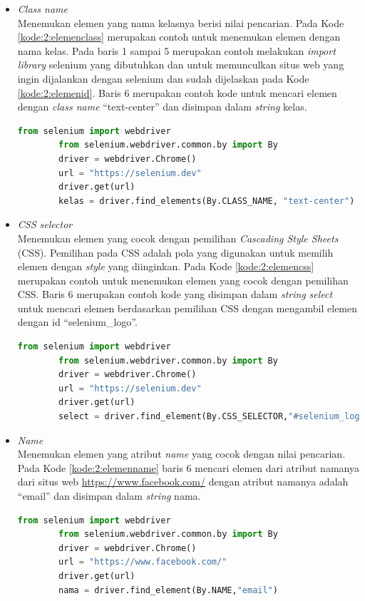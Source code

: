 \begin{itemize}
	\item \textit{Class name}\\
	Menemukan elemen yang nama kelasnya berisi nilai pencarian. Pada Kode \ref{kode:2:elemenclass} merupakan contoh untuk menemukan elemen dengan nama kelas. Pada baris 1 sampai 5 merupakan contoh melakukan \textit{import library} selenium yang dibutuhkan dan untuk memunculkan situs web yang ingin dijalankan dengan selenium dan sudah dijelaskan pada Kode \ref{kode:2:elemenid}. Baris 6 merupakan contoh kode untuk mencari elemen dengan \textit{class name} ``text-center'' dan disimpan dalam \textit{string} kelas.
	\begin{lstlisting}[language=python, caption=Contoh kode untuk menemukan elemen dengan \textit{class name}, label=kode:2:elemenclass]
		from selenium import webdriver
		from selenium.webdriver.common.by import By
		driver = webdriver.Chrome()
		url = "https://selenium.dev"
		driver.get(url)
		kelas = driver.find_elements(By.CLASS_NAME, "text-center")
	\end{lstlisting}
\newpage
	\item \textit{CSS selector}\\
	Menemukan elemen yang cocok dengan pemilihan \textit{Cascading Style Sheets} (CSS). Pemilihan pada CSS adalah pola yang digunakan untuk memilih elemen dengan \textit{style} yang diinginkan. Pada Kode \ref{kode:2:elemencss} merupakan contoh untuk menemukan elemen yang cocok dengan pemilihan CSS. Baris 6 merupakan contoh kode yang disimpan dalam \textit{string} \textit{select} untuk mencari elemen berdasarkan pemilihan CSS dengan mengambil elemen dengan id ``selenium\_logo''.
	\begin{lstlisting}[language=python, caption=Contoh kode untuk menemukan elemen dengan \textit{CSS selector}, label=kode:2:elemencss]
		from selenium import webdriver
		from selenium.webdriver.common.by import By
		driver = webdriver.Chrome()
		url = "https://selenium.dev"
		driver.get(url)
		select = driver.find_element(By.CSS_SELECTOR,"#selenium_logo")
	\end{lstlisting}
	
	\item \textit{Name}\\
	Menemukan elemen yang atribut \textit{name} yang cocok dengan nilai pencarian. Pada Kode \ref{kode:2:elemenname} baris 6 mencari elemen dari atribut namanya dari situs web \url{https://www.facebook.com/} dengan atribut namanya adalah ``email'' dan disimpan dalam \textit{string} nama.
	\begin{lstlisting}[language=python, caption=Contoh kode untuk menemukan elemen dengan atribut nama, label=kode:2:elemenname]
		from selenium import webdriver
		from selenium.webdriver.common.by import By
		driver = webdriver.Chrome()
		url = "https://www.facebook.com/"
		driver.get(url)
		nama = driver.find_element(By.NAME,"email")
	\end{lstlisting}
	

\end{itemize}
